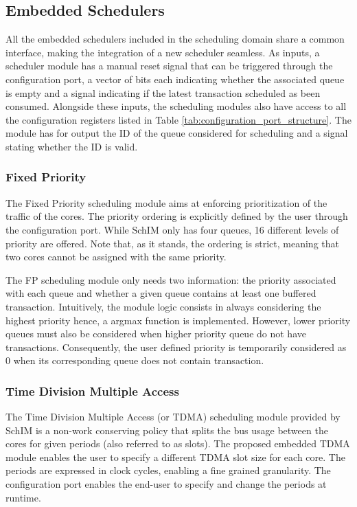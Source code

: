 \subsection{Embedded Schedulers}
All the embedded schedulers included in the scheduling domain share a
common interface, making the integration of a new scheduler
seamless. As inputs, a scheduler module has a manual reset signal that
can be triggered through the configuration port, a vector of bits each
indicating whether the associated queue is empty and a signal
indicating if the latest transaction scheduled as been
consumed. Alongside these inputs, the scheduling modules also have
access to all the configuration registers listed in Table
\ref{tab:configuration_port_structure}. The module has for output the
ID of the queue considered for scheduling and a signal stating whether
the ID is valid.

\subsubsection{Fixed Priority}
The Fixed Priority scheduling module aims at enforcing prioritization
of the traffic of the cores. The priority ordering is explicitly
defined by the user through the configuration port. While SchIM only
has four queues, 16 different levels of priority are offered. Note
that, as it stands, the ordering is strict, meaning that two cores
cannot be assigned with the same priority.

The FP scheduling module only needs two information: the priority
associated with each queue and whether a given queue contains at least
one buffered transaction. Intuitively, the module logic consists in
always considering the highest priority hence, a argmax function is
implemented. However, lower priority queues must also be considered
when higher priority queue do not have transactions. Consequently, the
user defined priority is temporarily considered as 0 when its
corresponding queue does not contain transaction.

\subsubsection{Time Division Multiple Access}
The Time Division Multiple Access (or TDMA) scheduling module provided
by SchIM is a non-work conserving policy that splits the bus usage
between the cores for given periods (also referred to as slots). The
proposed embedded TDMA module enables the user to specify a different
TDMA slot size for each core. The periods are expressed in clock
cycles, enabling a fine grained granularity. The configuration port
enables the end-user to specify and change the periods at runtime.

